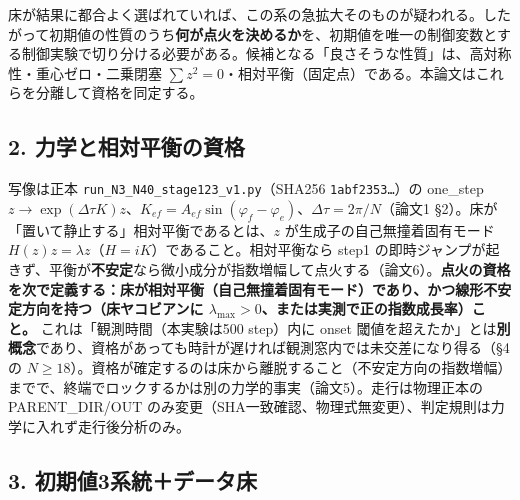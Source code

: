\documentclass[
  a4paper,
]{ltjsarticle}
\begin{document}
床が結果に都合よく選ばれていれば、この系の急拡大そのものが疑われる。したがって初期値の性質のうち\textbf{何が点火を決めるか}を、初期値を唯一の制御変数とする制御実験で切り分ける必要がある。候補となる「良さそうな性質」は、高対称性・重心ゼロ・二乗閉塞
\(\sum z^2=0\)・相対平衡（固定点）である。本論文はこれらを分離して資格を同定する。

\subsection{2.
力学と相対平衡の資格}\label{ux529bux5b66ux3068ux76f8ux5bfeux5e73ux8861ux306eux8cc7ux683c}

写像は正本 \texttt{run\_N3\_N40\_stage123\_v1.py}（SHA256
\texttt{1abf2353…}）の one\_step
\(z\to\exp(\Delta\tau K)z\)、\(K_{ef}=A_{ef}\sin(\varphi_f-\varphi_e)\)、\(\Delta\tau=2\pi/N\)（論文1
§2）。床が「置いて静止する」相対平衡であるとは、\(z\)
が生成子の自己無撞着固有モード
\(H(z)z=\lambda z\)（\(H=iK\)）であること。相対平衡なら step1
の即時ジャンプが起きず、平衡が\textbf{不安定}なら微小成分が指数増幅して点火する（論文6）。\textbf{点火の資格を次で定義する：床が相対平衡（自己無撞着固有モード）であり、かつ線形不安定方向を持つ（床ヤコビアンに
\(\lambda_{\max}>0\)、または実測で正の指数成長率）こと。}
これは「観測時間（本実験は500 step）内に onset
閾値を超えたか」とは\textbf{別概念}であり、資格があっても時計が遅ければ観測窓内では未交差になり得る（§4
の
\(N\ge18\)）。資格が確定するのは床から離脱すること（不安定方向の指数増幅）までで、終端でロックするかは別の力学的事実（論文5）。走行は物理正本の
PARENT\_DIR/OUT
のみ変更（SHA一致確認、物理式無変更）、判定規則は力学に入れず走行後分析のみ。

\subsection{3.
初期値3系統＋データ床}\label{ux521dux671fux50243ux7cfbux7d71ux30c7ux30fcux30bfux5e8a}
\end{document}

